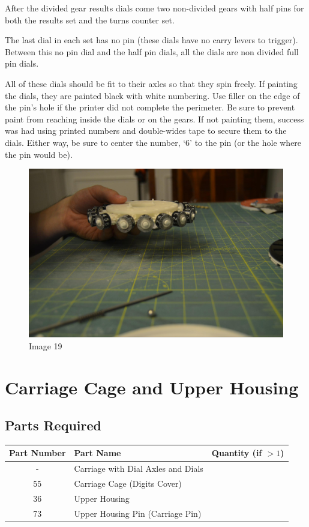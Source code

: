 \documentclass[openany]{book}
\begin{document}
After the divided gear results dials come two non-divided gears with half pins for both the results set and the turns counter set.

The last dial in each set has no pin (these dials have no carry levers to trigger). Between this no pin dial and the half pin dials, all the dials are non divided full pin dials.

All of these dials should be fit to their axles so that they spin freely. If painting the dials, they are painted black with white numbering. Use filler on the edge of the pin's hole if the printer did not complete the perimeter. Be sure to prevent paint from reaching inside the dials or on the gears. If not painting them, success was had using printed numbers and double-wides tape to secure them to the dials. Either way, be sure to center the number, ‘6’ to the pin (or the hole where the pin would be).

\begin{figure}[!ht]
	\centering
	\includegraphics[width=.75\textwidth]{images/image19.jpg}
	\caption{Image 19}
	\label{fig:image19}	
\end{figure}



\chapter{Carriage Cage and Upper Housing}
\section{Parts Required}
\begin{table}[!ht]
	\centering
	\begin{tabular}{clc}
		Part Number & Part Name & Quantity (if $>1$) \\ \hline
		- & Carriage with Dial Axles and Dials & \\
		55 & Carriage Cage (Digits Cover) & \\
		36 & Upper Housing & \\
		73 & Upper Housing Pin (Carriage Pin) & 
	\end{tabular}
\end{table}
\end{document}
